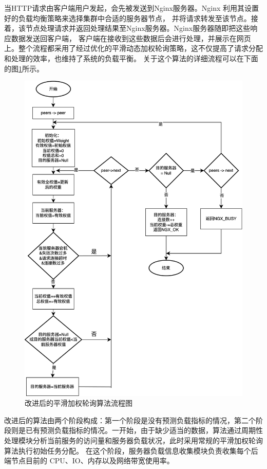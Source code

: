 当HTTP请求由客户端用户发起，会先被发送到Nginx服务器。Nginx 利用其设置好的负载均衡策略来选择集群中合适的服务器节点，
并将请求转发至该节点。接着，该节点处理请求并返回处理结果至Nginx服务器。Nginx服务器随即把这些响应数据发送回客户端，
客户端在接收到这些数据后会进行处理，并展示在网页上。整个流程都采用了经过优化的平滑动态加权轮询策略，这不仅提高了请求分配和处理的效率，也维持了系统的负载平衡。
关于这个算法的详细流程可以在下面的图\ref{new_smoth_weight_balance}所示。

\begin{figure}[htbp]
	\centering
	\includegraphics[width=\textwidth]{figures/new_smoth_weight_balance.jpg}
	\caption{改进后的平滑加权轮询算法流程图}
	\label{new_smoth_weight_balance}
\end{figure}

改进后的算法由两个阶段构成：第一个阶段是没有预测负载指标的情况，第二个阶段则是已有预测负载指标的情况。一开始，由于缺少适当的数据，算法通过周期性处理模块分析当前服务的访问量和服务器负载状况，此时采用常规的平滑加权轮询算法执行初始任务分配。
在这个阶段，服务器负载信息收集模块负责收集每个后端节点目前的 CPU、IO、内存以及网络带宽使用率。


